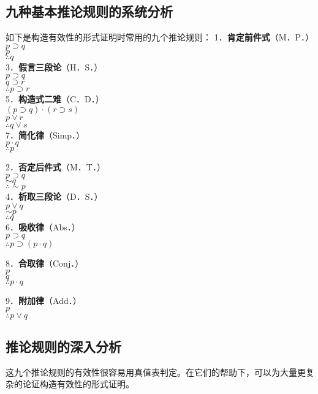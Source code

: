 \subsection{九种基本推论规则的系统分析}

如下是构造有效性的形式证明时常用的九个推论规则：
1．\textbf{肯定前件式}（M．P．）\\
$p \supset q$\\
$p$\\
$\therefore q$\\
3．\textbf{假言三段论}（H．S．）\\
$p \supset q$\\
$q \supset r$\\
$\therefore p \supset r$\\
5．\textbf{构造式二难}（C．D．）\\
$(p \supset q) \cdot(r \supset s)$\\
$p \vee r$\\
$\therefore q \vee s$\\
7．\textbf{简化律}（Simp．）\\
$p \cdot q$\\
$\therefore p$

2．\textbf{否定后件式}（M．T．）\\
$p \supset q$\\
$\sim q$\\
$\therefore \sim p$\\
4．\textbf{析取三段论}（D．S．）\\
$p \vee q$\\
$\sim p$\\
$\therefore q$\\
6．\textbf{吸收律}（Abs．）\\
$p \supset q$\\
$\therefore p \supset(p \cdot q)$

8．\textbf{合取律}（Conj．）\\
$p$\\
$q$\\
$\therefore p \cdot q$

9．\textbf{附加律}（Add．）\\
$p$\\
$\therefore p \vee q$

\subsection{推论规则的深入分析}

这九个推论规则的有效性很容易用真值表判定。在它们的帮助下，可以为大量更复杂的论证构造有效性的形式证明。


